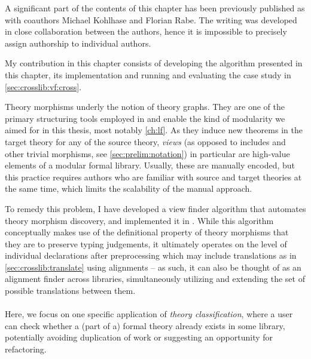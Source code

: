 \begin{disclaimer*}
	A significant part of the contents of this chapter  has been previously published as 
\cite{MueKohRab:aftmkm18} with coauthors Michael Kohlhase and Florian Rabe. The writing was developed in close collaboration between the authors, hence it is impossible to precisely assign authorship to individual authors.
	
	My contribution in this chapter consists of developing the algorithm presented in this chapter, its implementation and running and evaluating the case study in \autoref{sec:crosslib:vf:cross}.
\end{disclaimer*}

  Theory morphisms underly the notion of theory graphs. They are one of the primary structuring tools employed in \mmt and enable the kind of modularity we aimed for in this thesis, most notably \autoref{ch:lf}. As they induce new theorems in the target theory for any of the source theory, \emph{views} (as opposed to includes and other trivial morphisms, see \autoref{sec:prelim:notation}) in particular are high-value elements of
  a modular formal library. Usually, these are manually encoded, but this
  practice requires authors who are familiar with source and target theories at the same
  time, which limits the scalability of the manual approach. 

  To remedy this problem, I have developed a view finder algorithm that automates theory
  morphism discovery, and implemented it in \mmt. While this algorithm conceptually makes use of the definitional property of theory morphisms that they are to preserve typing judgements, it ultimately operates on the level of individual declarations after preprocessing which may include translations as in \autoref{sec:crosslib:translate} using alignments -- as such, it can also be thought of as an alignment finder across libraries, simultaneously utilizing and extending the set of possible translations between them.
  
 \paragraph{}  Here, we focus on one specific application of 
  \emph{theory classification}, where a user can
  check whether a (part of a) formal theory already exists in some library, potentially
  avoiding duplication of work or suggesting an opportunity for refactoring.

